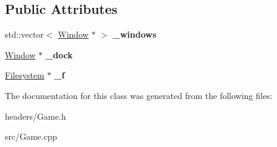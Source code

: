\subsection*{Public Attributes}
\begin{DoxyCompactItemize}
\item 
\hypertarget{class_game_ade70038b3153f5f293636d6d56f94562}{}\label{class_game_ade70038b3153f5f293636d6d56f94562} 
std\+::vector$<$ \hyperlink{class_window}{Window} $\ast$ $>$ {\bfseries \+\_\+windows}
\item 
\hypertarget{class_game_a95f4c70882199f901d2bdb5246c07cd6}{}\label{class_game_a95f4c70882199f901d2bdb5246c07cd6} 
\hyperlink{class_window}{Window} $\ast$ {\bfseries \+\_\+dock}
\item 
\hypertarget{class_game_ab7c57ed53d2f36d767f917d0e216348f}{}\label{class_game_ab7c57ed53d2f36d767f917d0e216348f} 
\hyperlink{class_filesystem}{Filesystem} $\ast$ {\bfseries \+\_\+f}
\end{DoxyCompactItemize}


The documentation for this class was generated from the following files\+:\begin{DoxyCompactItemize}
\item 
headers/Game.\+h\item 
src/Game.\+cpp\end{DoxyCompactItemize}
